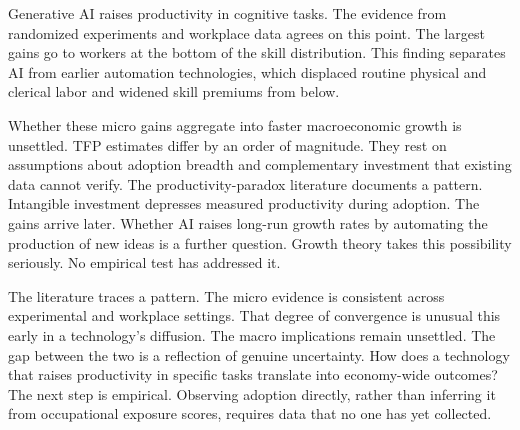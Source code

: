 \documentclass[12pt]{article}
\begin{document}
Generative AI raises productivity in cognitive tasks. The evidence from randomized experiments and workplace data agrees on this point. The largest gains go to workers at the bottom of the skill distribution. This finding separates AI from earlier automation technologies, which displaced routine physical and clerical labor and widened skill premiums from below.

Whether these micro gains aggregate into faster macroeconomic growth is unsettled. TFP estimates differ by an order of magnitude. They rest on assumptions about adoption breadth and complementary investment that existing data cannot verify. The productivity-paradox literature documents a pattern. Intangible investment depresses measured productivity during adoption. The gains arrive later. Whether AI raises long-run growth rates by automating the production of new ideas is a further question. Growth theory takes this possibility seriously. No empirical test has addressed it.

The literature traces a pattern. The micro evidence is consistent across experimental and workplace settings. That degree of convergence is unusual this early in a technology's diffusion. The macro implications remain unsettled. The gap between the two is a reflection of genuine uncertainty. How does a technology that raises productivity in specific tasks translate into economy-wide outcomes? The next step is empirical. Observing adoption directly, rather than inferring it from occupational exposure scores, requires data that no one has yet collected.




\end{document}
